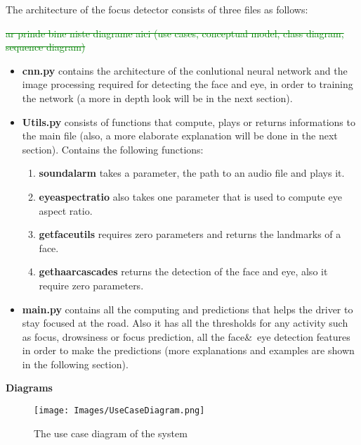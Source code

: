 The architecture of the focus detector consists of three files as follows:

\textcolor{green}{\sout{ar prinde bine niste diagrame aici (use cases, conceptual model, class diagram, sequence diagram)}}

\begin{itemize}
    \item \textbf{cnn.py} contains the architecture of the conlutional neural network and the image processing required for detecting the face and eye, in order to training the network (a more in depth look will be in the next section).
    \item \textbf{Utils.py} consists of functions that compute, plays or returns informations to the main file (also, a more elaborate explanation will be done in the next section). Contains the following functions: 
        \begin{enumerate}
            \item \textbf{sound\textunderscore alarm} takes a parameter, the path to an audio file and plays it.
            
            \item \textbf{eye\textunderscore aspect\textunderscore ratio} also takes one parameter that is used to compute eye aspect ratio.
            
            \item \textbf{get\textunderscore face\textunderscore utils} requires zero parameters and returns the landmarks of a face.
            
            \item \textbf{get\textunderscore haar\textunderscore cascades} returns the detection of the face and eye, also it require zero parameters.
        \end{enumerate}
    \item \textbf{main.py} contains all the computing and predictions that helps the driver to stay focused at the road. Also it has all the thresholds for any activity such as focus, drowsiness or focus prediction, all the face\&\ eye detection features in order to make the predictions (more explanations and examples are shown in the following section).
\end{itemize}

\textbf{Diagrams}

\begin{figure}[h!]
    \centering
    \texttt{[image: Images/UseCaseDiagram.png]}
    \caption{The use case diagram of the system}
    \label{fig:UseCaseDiagram}
\end{figure}

